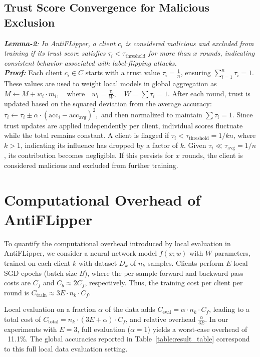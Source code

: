 \documentclass[conference]{IEEEtran}
\begin{document}
\subsection{Trust Score Convergence for Malicious Exclusion}
\textit{\textbf{Lemma-2}: In AntiFLipper, a client \( c_i \) is considered malicious and excluded from training if its trust score satisfies \( \tau_i < \tau_{\text{threshold}} \) for more than \( x \)  rounds, indicating consistent behavior associated with label-flipping attacks.} \\

\textit{\textbf{Proof:}} Each client \( c_i \in C \) starts with a trust value \( \tau_i = \frac{1}{n} \), ensuring \( \sum_{i=1}^n \tau_i = 1 \). These values are used to weight local models in global aggregation as  \(M \gets M + w_i \cdot m_i, \quad \text{where} \quad w_i = \frac{\tau_i}{W}, \quad W = \sum \tau_i = 1.\) After each round, trust is updated based on the squared deviation from the average accuracy: \(
\tau_i \gets \tau_i \pm \alpha \cdot (\text{acc}_i - \text{acc}_{\text{avg}})^2, \)
and then normalized to maintain \( \sum \tau_i = 1 \). Since trust updates are applied independently per client, individual scores fluctuate while the total remains constant. A client is flagged if \( \tau_i < \tau_{\text{threshold}} = {1} / {kn} \), where \( k > 1 \), indicating its influence has dropped by a factor of \( k \). Given \( \tau_i \ll \tau_{\text{avg}} = {1} / {n} \), its contribution becomes negligible. If this persists for \( x \)  rounds, the client is considered malicious and excluded from further training.



\section{Computational Overhead of AntiFLipper}

To quantify the computational overhead introduced by local evaluation in {AntiFLipper}, we consider a neural network model $f(x; w)$ with $W$ parameters, trained on each client $k$ with dataset $D_k$ of $n_k$ samples. Clients perform $E$ local SGD epochs (batch size $B$), where the per-sample forward and backward pass costs are $C_f$ and $C_b \approx 2C_f$, respectively. Thus, the training cost per client per round is $C_{\text{train}} \approx 3E \cdot n_k \cdot C_f$.

Local evaluation on a fraction $\alpha$ of the data adds $C_{\text{eval}} = \alpha \cdot n_k \cdot C_f$, leading to a total cost of $C_{\text{total}} = n_k \cdot (3E + \alpha) \cdot C_f$, and relative overhead $\frac{\alpha}{3E}$. In our experiments with $E = 3$, full evaluation ($\alpha = 1$) yields a worst-case overhead of ~11.1\%. The global accuracies reported in Table~\ref{table:result_table} correspond to this full local data evaluation setting.
\end{document}

